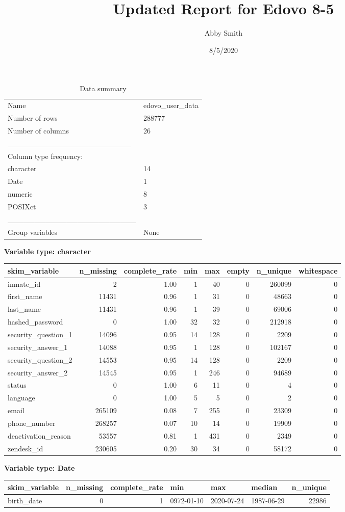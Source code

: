 \documentclass[
]{article}
\title{Updated Report for Edovo 8-5}
\author{Abby Smith}
\date{8/5/2020}
\begin{document}
\maketitle

\begin{longtable}[]{@{}ll@{}}
\caption{Data summary}\tabularnewline
\toprule
\endhead
Name & edovo\_user\_data\tabularnewline
Number of rows & 288777\tabularnewline
Number of columns & 26\tabularnewline
\_\_\_\_\_\_\_\_\_\_\_\_\_\_\_\_\_\_\_\_\_\_\_ &\tabularnewline
Column type frequency: &\tabularnewline
character & 14\tabularnewline
Date & 1\tabularnewline
numeric & 8\tabularnewline
POSIXct & 3\tabularnewline
\_\_\_\_\_\_\_\_\_\_\_\_\_\_\_\_\_\_\_\_\_\_\_\_ &\tabularnewline
Group variables & None\tabularnewline
\bottomrule
\end{longtable}

\textbf{Variable type: character}

\begin{longtable}[]{@{}lrrrrrrr@{}}
\toprule
skim\_variable & n\_missing & complete\_rate & min & max & empty &
n\_unique & whitespace\tabularnewline
\midrule
\endhead
inmate\_id & 2 & 1.00 & 1 & 40 & 0 & 260099 & 0\tabularnewline
first\_name & 11431 & 0.96 & 1 & 31 & 0 & 48663 & 0\tabularnewline
last\_name & 11431 & 0.96 & 1 & 39 & 0 & 69006 & 0\tabularnewline
hashed\_password & 0 & 1.00 & 32 & 32 & 0 & 212918 & 0\tabularnewline
security\_question\_1 & 14096 & 0.95 & 14 & 128 & 0 & 2209 &
0\tabularnewline
security\_answer\_1 & 14088 & 0.95 & 1 & 128 & 0 & 102167 &
0\tabularnewline
security\_question\_2 & 14553 & 0.95 & 14 & 128 & 0 & 2209 &
0\tabularnewline
security\_answer\_2 & 14545 & 0.95 & 1 & 246 & 0 & 94689 &
0\tabularnewline
status & 0 & 1.00 & 6 & 11 & 0 & 4 & 0\tabularnewline
language & 0 & 1.00 & 5 & 5 & 0 & 2 & 0\tabularnewline
email & 265109 & 0.08 & 7 & 255 & 0 & 23309 & 0\tabularnewline
phone\_number & 268257 & 0.07 & 10 & 14 & 0 & 19909 & 0\tabularnewline
deactivation\_reason & 53557 & 0.81 & 1 & 431 & 0 & 2349 &
0\tabularnewline
zendesk\_id & 230605 & 0.20 & 30 & 34 & 0 & 58172 & 0\tabularnewline
\bottomrule
\end{longtable}

\textbf{Variable type: Date}

\begin{longtable}[]{@{}lrrlllr@{}}
\toprule
skim\_variable & n\_missing & complete\_rate & min & max & median &
n\_unique\tabularnewline
\midrule
\endhead
birth\_date & 0 & 1 & 0972-01-10 & 2020-07-24 & 1987-06-29 &
22986\tabularnewline
\bottomrule
\end{longtable}
\end{document}
